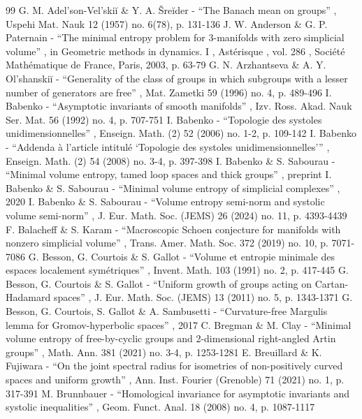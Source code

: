\begin{thebibliography}{99}
 G. M. Adel’son-Vel’skiĭ \& Y. A. Šreĭder - “The Banach mean on groups” , Uspehi Mat. Nauk 12 (1957) no. 6(78), p. 131-136
 J. W. Anderson \& G. P. Paternain - “The minimal entropy problem for 3-manifolds with zero simplicial volume” , in Geometric methods in dynamics. I , Astérisque , vol. 286 , Société Mathématique de France, Paris, 2003, p. 63-79
 G. N. Arzhantseva \& A. Y. Ol’shanskiĭ - “Generality of the class of groups in which subgroups with a lesser number of generators are free” , Mat. Zametki 59 (1996) no. 4, p. 489-496
 I. Babenko - “Asymptotic invariants of smooth manifolds” , Izv. Ross. Akad. Nauk Ser. Mat. 56 (1992) no. 4, p. 707-751
 I. Babenko - “Topologie des systoles unidimensionnelles” , Enseign. Math. (2) 52 (2006) no. 1-2, p. 109-142
 I. Babenko - “Addenda à l’article intitulé ‘Topologie des systoles unidimensionnelles’” , Enseign. Math. (2) 54 (2008) no. 3-4, p. 397-398
 I. Babenko \& S. Sabourau - “Minimal volume entropy, tamed loop spaces and thick groups” , preprint
 I. Babenko \& S. Sabourau - “Minimal volume entropy of simplicial complexes” , 2020
 I. Babenko \& S. Sabourau - “Volume entropy semi-norm and systolic volume semi-norm” , J. Eur. Math. Soc. (JEMS) 26 (2024) no. 11, p. 4393-4439
 F. Balacheff \& S. Karam - “Macroscopic Schoen conjecture for manifolds with nonzero simplicial volume” , Trans. Amer. Math. Soc. 372 (2019) no. 10, p. 7071-7086
 G. Besson, G. Courtois \& S. Gallot - “Volume et entropie minimale des espaces localement symétriques” , Invent. Math. 103 (1991) no. 2, p. 417-445
 G. Besson, G. Courtois \& S. Gallot - “Uniform growth of groups acting on Cartan-Hadamard spaces” , J. Eur. Math. Soc. (JEMS) 13 (2011) no. 5, p. 1343-1371
 G. Besson, G. Courtois, S. Gallot \& A. Sambusetti - “Curvature-free Margulis lemma for Gromov-hyperbolic spaces” , 2017
 C. Bregman \& M. Clay - “Minimal volume entropy of free-by-cyclic groups and 2-dimensional right-angled Artin groups” , Math. Ann. 381 (2021) no. 3-4, p. 1253-1281
 E. Breuillard \& K. Fujiwara - “On the joint spectral radius for isometries of non-positively curved spaces and uniform growth” , Ann. Inst. Fourier (Grenoble) 71 (2021) no. 1, p. 317-391
 M. Brunnbauer - “Homological invariance for asymptotic invariants and systolic inequalities” , Geom. Funct. Anal. 18 (2008) no. 4, p. 1087-1117

\end{thebibliography}
